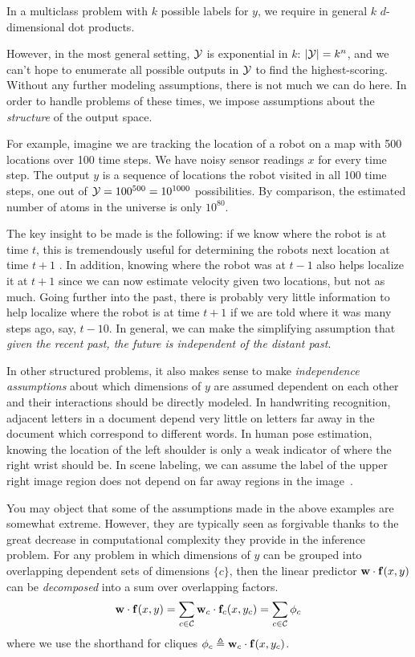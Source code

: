 In a multiclass problem with $k$ possible labels for $y$, we require in general $k$ $d$-dimensional dot products.

However, in the most general setting, $\mathcal{Y}$ is exponential in 
$k$: $|\mathcal{Y}| = k^n$, and we can't hope to enumerate all possible outputs in 
$\mathcal{Y}$ to find the highest-scoring.  Without any further modeling assumptions, 
there is not much we can do here.  In order to handle problems of these times, 
we impose assumptions about the {\em structure} of the output space.  

For example, imagine we are tracking the location of a robot on a map with 500 
locations over 100 time steps.  We have noisy sensor readings $x$ for every 
time step.  The output $y$ is a sequence of locations the robot visited in all 
100 time steps, one out of $\mathcal{Y} = 100^{500} = 10^{1000}$ possibilities.  By 
comparison, the estimated number of atoms in the universe is only $10^{80}$.  

The key insight to be made is the following: if we know where the robot is at 
time $t$, this is tremendously useful for determining the robots next location 
at time $t+1$ .  In addition, knowing where the robot was at $t-1$ also helps 
localize it at $t+1$ since we can now estimate velocity given two locations, 
but not as much.  Going further into the past, there is probably very little 
information to help localize where the robot is at time $t+1$ if we are told 
where it was many steps ago, say, $t-10$.  In general, we can make the 
simplifying assumption that {\em given the recent past, the future is 
independent of the distant past}.

In other structured problems, it also makes sense to make {\em independence 
assumptions} about which dimensions of $y$ are assumed dependent on each other and their interactions should be directly modeled. 
In handwriting recognition, adjacent letters in a document 
depend very little on letters far away in the document which correspond to different words.
In human pose estimation, knowing the location of the left shoulder is only a weak indicator of where the right wrist should be. In scene labeling, we can assume the label of the upper right image region does not depend on far away regions in the image~\citep{cour05}.

You may object that some of the assumptions made in the above examples are 
somewhat extreme.  However, they are typically seen as forgivable thanks to the 
great decrease in computational complexity they provide in the inference 
problem.  For any problem in which dimensions of $y$ can be grouped into 
overlapping dependent sets of dimensions $\{c\}$, then the linear predictor $\mathbf{w} 
\cdot \mathbf{f}(x,y)$ can be {\em decomposed} into a sum over overlapping factors.
\begin{equation}
\mathbf{w} \cdot \mathbf{f}(x,y) = \sum_{c \in \mathcal{C}} \mathbf{w}_c \cdot \mathbf{f}_c(x,y_c) = \sum_{c \in \mathcal{C}} \phi_c
\end{equation}
where we use the shorthand for cliques $\phi_c \triangleq \mathbf{w}_c \cdot \mathbf{f}(x,y_c)$.

